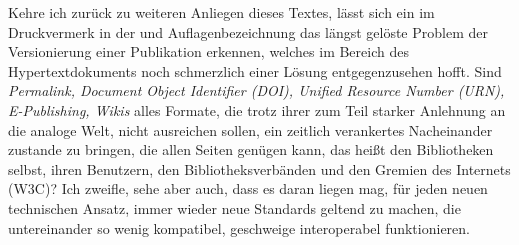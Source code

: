 \documentclass[a4paper,
fontsize=11pt,
oneside,
numbers=noperiodatend,
parskip=half-,
bibliography=totoc,
final
]{scrartcl}
\begin{document}
Kehre ich zurück zu weiteren Anliegen dieses Textes, lässt sich ein im
Druckvermerk in der und Auflagenbezeichnung das längst gelöste Problem
der Versionierung einer Publikation erkennen, welches im Bereich des
Hypertextdokuments noch schmerzlich einer Lösung entgegenzusehen hofft.
Sind \emph{Permalink, Document Object Identifier (DOI), Unified Resource
Number (URN), E-Publishing, Wikis} alles Formate, die trotz ihrer zum
Teil starker Anlehnung an die analoge Welt, nicht ausreichen sollen, ein
zeitlich verankertes Nacheinander zustande zu bringen, die allen Seiten
genügen kann, das heißt den Bibliotheken selbst, ihren Benutzern, den
Bibliotheksverbänden und den Gremien des Internets (W3C)? Ich zweifle,
sehe aber auch, dass es daran liegen mag, für jeden neuen technischen
Ansatz, immer wieder neue Standards geltend zu machen, die untereinander
so wenig kompatibel, geschweige interoperabel funktionieren.
\end{document}
